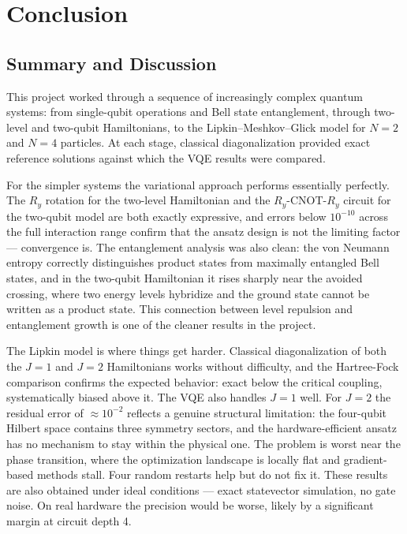 \section{Conclusion}\label{sec:conclusion}

\subsection{Summary and Discussion}
\label{subsec:conclusion-summary}

This project worked through a sequence of increasingly complex quantum systems: from single-qubit operations and Bell state entanglement, through two-level and two-qubit Hamiltonians, to the Lipkin--Meshkov--Glick model for $N=2$ and $N=4$ particles. At each stage, classical diagonalization provided exact reference solutions against which the VQE results were compared.

For the simpler systems the variational approach performs essentially perfectly. The $R_y$ rotation for the two-level Hamiltonian and the $R_y$-CNOT-$R_y$ circuit for the two-qubit model are both exactly expressive, and errors below $10^{-10}$ across the full interaction range confirm that the ansatz design is not the limiting factor — convergence is. The entanglement analysis was also clean: the von Neumann entropy correctly distinguishes product states from maximally entangled Bell states, and in the two-qubit Hamiltonian it rises sharply near the avoided crossing, where two energy levels hybridize and the ground state cannot be written as a product state. This connection between level repulsion and entanglement growth is one of the cleaner results in the project.

The Lipkin model is where things get harder. Classical diagonalization of both the $J=1$ and $J=2$ Hamiltonians works without difficulty, and the Hartree-Fock comparison confirms the expected behavior: exact below the critical coupling, systematically biased above it. The VQE also handles $J=1$ well. For $J=2$ the residual error of $\approx10^{-2}$ reflects a genuine structural limitation: the four-qubit Hilbert space contains three symmetry sectors, and the hardware-efficient ansatz has no mechanism to stay within the physical one. The problem is worst near the phase transition, where the optimization landscape is locally flat and gradient-based methods stall. Four random restarts help but do not fix it. These results are also obtained under ideal conditions — exact statevector simulation, no gate noise. On real hardware the precision would be worse, likely by a significant margin at circuit depth 4.

